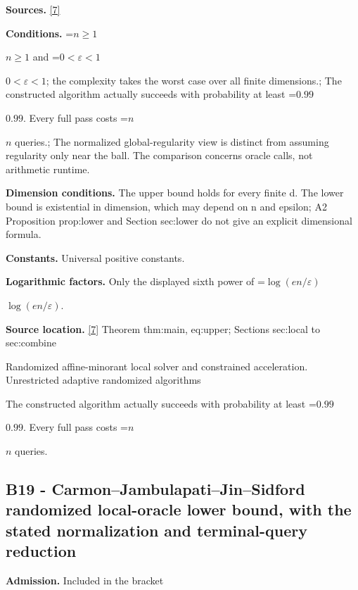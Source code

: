 \documentclass[10pt,a4paper]{article}
\newcommand{\AtlasMath}[1]{\par\begingroup\centering\setbox0=\hbox{$\displaystyle #1$}\ifdim\wd0>1.4\linewidth\typeout{ATLAS WIDE FORMULA: \the\wd0}\fi\ifdim\wd0>\linewidth\resizebox{\linewidth}{!}{\box0}\else\box0\fi\par\endgroup}
\newcommand{\AtlasInlineMath}[1]{\begingroup\setbox0=\hbox{$#1$}\ifdim\wd0>.4\linewidth\endgroup\AtlasMath{#1}\else\endgroup$#1$\fi}
\begin{document}
\textbf{Sources.} \href{https://github.com/WU-Wendao/Colombo/blob/main/colombo_sensorium/Complexity_altas/data/sources/colombo/A2/manuscript.pdf}{[7]}



\textbf{Conditions.} \AtlasInlineMath{n\ge1} and \AtlasInlineMath{0<\varepsilon<1}; the complexity takes the worst case over all finite dimensions.; The constructed algorithm actually succeeds with probability at least \AtlasInlineMath{0.99}. Every full pass costs \AtlasInlineMath{n} queries.; The normalized global-regularity view is distinct from assuming regularity only near the ball. The comparison concerns oracle calls, not arithmetic runtime.



\textbf{Dimension conditions.} The upper bound holds for every finite d. The lower bound is existential in dimension, which may depend on n and epsilon; A2 Proposition prop:lower and Section sec:lower do not give an explicit dimensional formula.



\textbf{Constants.} Universal positive constants.



\textbf{Logarithmic factors.} Only the displayed sixth power of \AtlasInlineMath{\log(en/\varepsilon)}.



\textbf{Source location.} \href{https://github.com/WU-Wendao/Colombo/blob/main/colombo_sensorium/Complexity_altas/data/sources/colombo/A2/manuscript.pdf}{[7]} Theorem thm:main, eq:upper; Sections sec:local to sec:combine



Randomized affine-minorant local solver and constrained acceleration. Unrestricted adaptive randomized algorithms



The constructed algorithm actually succeeds with probability at least \AtlasInlineMath{0.99}. Every full pass costs \AtlasInlineMath{n} queries.



\subsection{B19 - Carmon--Jambulapati--Jin--Sidford randomized local-oracle lower bound, with the stated normalization and terminal-query reduction}


\textbf{Admission.} Included in the bracket
\end{document}
